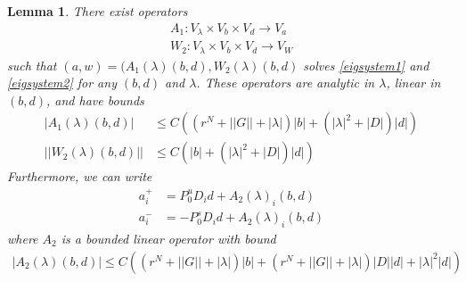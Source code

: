 \documentclass[12pt]{article}
\newtheorem{lemma}{Lemma}
\begin{document}
\begin{lemma}\label{eiginv2}
There exist operators 
\begin{align*}
A_1 : V_\lambda \times V_b \times V_d \rightarrow V_a \\
W_2 : V_\lambda \times V_b \times V_d \rightarrow V_W
\end{align*}
such that $(a, w) = (A_1(\lambda)(b,d), W_2(\lambda)(b,d)$ solves \eqref{eigsystem1} and \eqref{eigsystem2} for any $(b, d)$ and $\lambda$. These operators are analytic in $\lambda$, linear in $(b,d)$, and have bounds 
\begin{align}
|A_1(\lambda)(b, d)| &\leq C \left( (r^N + ||G|| + |\lambda| ) |b| + (|\lambda|^2 + |D| ) |d| \right) \label{A1bound} \\
||W_2(\lambda)(b,d)|| &\leq C \left( |b| + (|\lambda|^2 + |D|) |d| \right) \label{W2bound}
\end{align}
Furthermore, we can write
\begin{align*}
a_i^+ &= P_0^u D_i d + A_2(\lambda)_i(b,d) \\
a_i^- &= -P_0^s D_i d + A_2(\lambda)_i(b,d)
\end{align*}
where $A_2$ is a bounded linear operator with bound
\begin{align}\label{A2bound}
|A_2(\lambda)(b,d)| \leq 
C\left( (r^N + ||G|| + |\lambda| )|b| + (r^N + ||G|| + |\lambda|)|D||d| + |\lambda|^2 |d|  \right)
\end{align}


\end{lemma}
\end{document}
